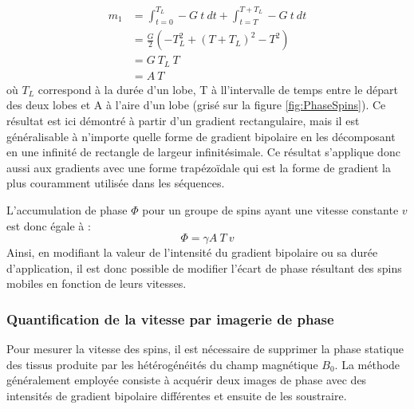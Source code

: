 	\begin{equation}
	\begin{split}
	m_1 &= \int_{t=0}^{T_L} -G \ t \ dt  + \int_{t=T}^{T+T_L} -G \ t \ dt  \\
			&= \frac{G}{2}\left(-T_L^2+(T+T_L)^2-T^2\right) \\
			&=G \ T_L \ T \\
			& = A \ T
	\end{split} 
	\end{equation}	
où $T_L$ correspond à la durée d'un lobe, T à ll'intervalle de temps entre le départ des deux lobes et A à l'aire d'un lobe (grisé sur la figure \ref{fig:PhaseSpins}). Ce résultat est ici démontré à partir d'un gradient rectangulaire, mais il est généralisable à n'importe quelle forme de gradient bipolaire en les décomposant en une infinité de rectangle de largeur infinitésimale. Ce résultat s'applique donc aussi aux gradients avec une forme trapézoïdale qui est la forme de gradient la plus couramment utilisée dans les séquences.

L'accumulation de phase $\Phi$ pour un groupe de spins ayant une vitesse constante $v$ est donc égale à :
\begin{equation}
\label{eq:VitessePhase}
\Phi = \gamma A \ T \ v
\end{equation}
Ainsi, en modifiant la valeur de l'intensité du gradient bipolaire ou sa durée d'application, il est donc possible de modifier l'écart de phase résultant des spins mobiles en fonction de leurs vitesses.

\subsubsection{Quantification de la vitesse par imagerie de phase}

Pour mesurer la vitesse des spins, il est nécessaire de supprimer la phase statique des tissus produite par les hétérogénéités du champ magnétique $B_0$. La méthode généralement employée consiste à acquérir deux images de phase avec des intensités de gradient bipolaire différentes et ensuite de les soustraire.

